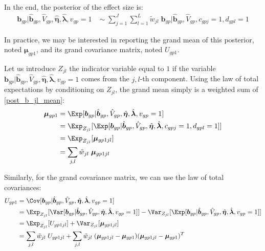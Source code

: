 \documentclass[11pt, oneside]{article}   	%
\begin{document}
In the end, the posterior of the effect size is:
\begin{equation}
  \label{post_b_cond_v}
  \begin{aligned}
    \bm{b}_{gp} | \hat{\bm{b}}_{gp}, \hat{V}_{gp}, \hat{\bm{\eta}}, \hat{\bm{\lambda}}, v_{gp}=1 \; &\sim \; \sum_{j=1}^J \sum_{l=1}^L \tilde{w}_{jl} \; \bm{b}_{gp} | \hat{\bm{b}}_{gp}, \hat{V}_{gp}, c_{gpj}=1, d_{gpl}=1
  \end{aligned}
\end{equation}

In practice, we may be interested in reporting the grand mean of this posterior, noted $\bm{\mu}_{gp1}$, and its grand covariance matrix, noted $U_{gp1}$.

Let us introduce $Z_{jl}$ the indicator variable equal to $1$ if the variable $\bm{b}_{gp} | \hat{\bm{b}}_{gp}, \hat{V}_{gp}, \hat{\bm{\eta}}, \hat{\bm{\lambda}}, v_{gp}=1$ comes from the $j,l$-th component.
Using the law of total expectations by conditioning on $Z_{jl}$, the grand mean simply is a weighted sum of \ref{post_b_jl_mean}:
\begin{equation}
  \label{post_b_cond_v_mean}
  \begin{aligned}
    \bm{\mu}_{gp1} &= \Exp[\bm{b}_{gp} | \hat{\bm{b}}_{gp}, \hat{V}_{gp}, \hat{\bm{\eta}}, \hat{\bm{\lambda}}, v_{gp}=1] \\
    &= \Exp_{Z_{jl}}[ \Exp[\bm{b}_{gp} | \hat{\bm{b}}_{gp}, \hat{V}_{gp}, \hat{\bm{\eta}}, \hat{\bm{\lambda}}, c_{gpj}=1, d_{gpl}=1 ] ] \\
    &= \Exp_{Z_{jl}}[ \bm{\mu}_{gp1jl} ] \\
    &= \sum_{j,l} \tilde{w}_{jl} \; \bm{\mu}_{gp1jl}
  \end{aligned}
\end{equation}

Similarly, for the grand covariance matrix, we can use the law of total covariances:
\begin{equation}
  \label{post_b_j_covar}
  \begin{aligned}
    U_{gp1} &= \Cov[ \bm{b}_{gp} | \hat{\bm{b}}_{gp}, \hat{V}_{gp}, \hat{\bm{\eta}}, \hat{\bm{\lambda}}, v_{gp}=1 ] \\
    &= \Exp_{Z_{jl}}[ \Var[\bm{b}_{gp} | \hat{\bm{b}}_{gp}, \hat{V}_{gp}, \hat{\bm{\eta}}, \hat{\bm{\lambda}}, v_{gp}=1 ] ] - \Var_{Z_{jl}}[ \Exp[\bm{b}_{gp} | \hat{\bm{b}}_{gp}, \hat{V}_{gp}, \hat{\bm{\eta}}, \hat{\bm{\lambda}}, v_{gp}=1 ] ] \\
    &= \Exp_{Z_{jl}}[ U_{gp1jl} ] + \Var_{Z_{jl}}[ \bm{\mu}_{gp1jl} ] \\
    &= \sum_{j,l} \tilde{w}_{jl} \; U_{gp1jl} + \sum_{j,l} \tilde{w}_{jl} \; (\bm{\mu}_{gp1jl} - \bm{\mu}_{gp1})(\bm{\mu}_{gp1jl} - \bm{\mu}_{gp1})^T
  \end{aligned}
\end{equation}
\end{document}
